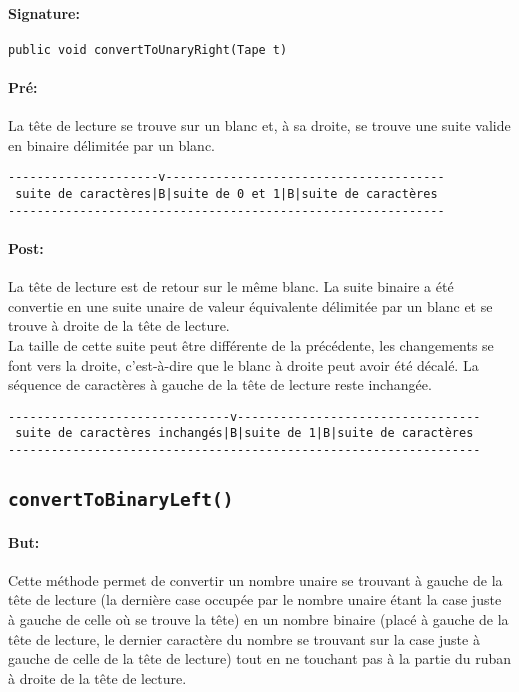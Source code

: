 \documentclass[a4paper,11pt]{article}
\begin{document}
\paragraph{Signature:} \texttt{public void convertToUnaryRight(Tape t)}
\paragraph{Pré:}
La tête de lecture se trouve sur un blanc et, à sa droite, se trouve une suite valide en binaire délimitée par un blanc.
\begin{verbatim}
---------------------v---------------------------------------
 suite de caractères|B|suite de 0 et 1|B|suite de caractères
-------------------------------------------------------------
\end{verbatim}
\paragraph{Post:}
La tête de lecture est de retour sur le même blanc. La suite binaire a été convertie en une suite unaire de valeur équivalente délimitée par un blanc et se trouve à droite de la tête de lecture.\\
La taille de cette suite peut être différente de la précédente, les changements se font vers la droite, c'est-à-dire que le blanc à droite peut avoir été décalé. La séquence de caractères à gauche de la tête de lecture reste inchangée.
\begin{verbatim}
-------------------------------v----------------------------------
 suite de caractères inchangés|B|suite de 1|B|suite de caractères
------------------------------------------------------------------
\end{verbatim}
\subsection{\texttt{convertToBinaryLeft()}}
\paragraph{But:} Cette méthode permet de convertir un nombre unaire se trouvant à gauche de la tête de lecture (la dernière case occupée par le nombre unaire étant la case juste à gauche de celle où se trouve la tête) en un nombre binaire (placé à gauche de la tête de lecture, le dernier caractère du nombre se trouvant sur la case juste à gauche de celle de la tête de lecture) tout en ne touchant pas à la partie du ruban à droite de la tête de lecture.
\end{document}
